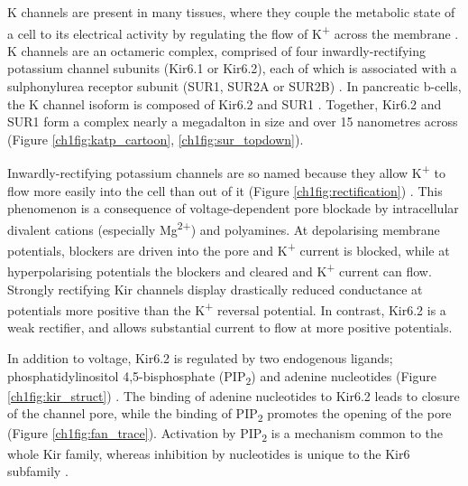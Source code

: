 K\ATP{} channels are present in many tissues, where they couple the metabolic state of a cell to its electrical activity by regulating the flow of K\textsuperscript{+} across the membrane \cite{nichols_k_2006}.
K\ATP{} channels are an octameric complex, comprised of four inwardly-rectifying potassium channel subunits (Kir6.1 or Kir6.2), each of which is associated with a sulphonylurea receptor subunit (SUR1, SUR2A or SUR2B) \cite{inagaki_family_1996, yamada_sulphonylurea_1997, shyng_octameric_1997, clement_association_1997}.
In pancreatic \textgreek{b}-cells, the K\ATP{} channel isoform is composed of Kir6.2 and SUR1 \cite{inagaki_reconstitution_1995}.
Together, Kir6.2 and SUR1 form a complex nearly a megadalton in size and over 15 nanometres across (Figure \ref{ch1fig:katp_cartoon}, \ref{ch1fig:sur_topdown}).

Inwardly-rectifying potassium channels are so named because they allow K\textsuperscript{+} to flow more easily into the cell than out of it (Figure \ref{ch1fig:rectification}) \cite{hille_ion_2001, zheng_handbook_2015}.
This phenomenon is a consequence of voltage-dependent pore blockade by intracellular divalent cations (especially Mg\textsuperscript{2+}) and polyamines.
At depolarising membrane potentials, blockers are driven into the pore and K\textsuperscript{+} current is blocked, while at hyperpolarising potentials the blockers and cleared and K\textsuperscript{+} current can flow.
Strongly rectifying Kir channels display drastically reduced conductance at potentials more positive than the K\textsuperscript{+} reversal potential.
In contrast, Kir6.2 is a weak rectifier, and allows substantial current to flow at more positive potentials.

In addition to voltage, Kir6.2 is regulated by two endogenous ligands; 
phosphatidylinositol 4,5-bisphosphate (PIP\textsubscript{2}) and adenine nucleotides (Figure \ref{ch1fig:kir_struct}) \cite{baukrowitz_pip2_1998, shyng_membrane_1998}.
The binding of adenine nucleotides to Kir6.2 leads to closure of the channel pore, while the binding of PIP\textsubscript{2} promotes the opening of the pore (Figure \ref{ch1fig:fan_trace}).
Activation by PIP\textsubscript{2} is a mechanism common to the whole Kir family, whereas inhibition by nucleotides is unique to the Kir6 subfamily \cite{enkvetchakul_direct_2005}.

